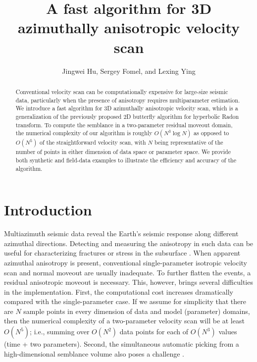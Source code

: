 
\title{A fast algorithm for 3D azimuthally anisotropic velocity scan}
\author{Jingwei Hu, Sergey Fomel, and Lexing Ying} 
  

\maketitle

\begin{abstract}
Conventional velocity scan can be computationally expensive for large-size seismic data, particularly when the presence of anisotropy requires multiparameter estimation. We introduce a fast algorithm for 3D azimuthally anisotropic velocity scan, which is a generalization of the previously proposed 2D butterfly algorithm for hyperbolic Radon transform. To compute the semblance in a two-parameter residual moveout domain, the numerical complexity of our algorithm is roughly $O(N^3\log N)$ as opposed to $O(N^5)$ of the straightforward velocity scan, with $N$ being representative of the number of points in either dimension of data space or parameter space. We provide both synthetic and field-data examples to illustrate the efficiency and accuracy of the algorithm.
\end{abstract}


\section{Introduction}

Multiazimuth seismic data reveal the Earth's seismic response along different azimuthal directions. Detecting and measuring the anisotropy in such data can be useful for characterizing fractures or stress in the subsurface \citep{TG}. When apparent azimuthal anisotropy is present, conventional single-parameter isotropic velocity scan and normal moveout are usually inadequate. To further flatten the events, a residual anisotropic moveout is necessary. This, however, brings several difficulties in the implementation. First, the computational cost increases dramatically compared with the single-parameter case. If we assume for simplicity that there are $N$ sample points in every dimension of data and model (parameter) domains, then the numerical complexity of a two-parameter velocity scan will be at least $O(N^5)$; i.e., summing over $O(N^2)$ data points for each of $O(N^3)$ values (time + two parameters). Second, the simultaneous automatic picking from a high-dimensional semblance volume also poses a challenge \citep{AB99, SMGSTH03, ARDC04, TDSFMHCO12}. 

